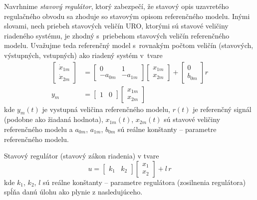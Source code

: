 \documentclass[a4paper, 10pt, ]{article}
\begin{document}
Navrhnime \emph{stavový regulátor}, ktorý zabezpečí, že stavový opis uzavretého regulačného obvodu sa zhoduje so stavovým opisom referenčného modelu. Inými slovami, nech priebeh stavových veličín URO, ktorými sú stavové veličiny riadeného systému, je zhodný s~priebehom stavových veličín referenčného modelu. Uvažujme teda referenčný model s~rovnakým počtom veličín (stavových, výstupných, vstupných) ako riadený systém v~tvare
\begin{subequations}
    \begin{align}
        \begin{bmatrix} \dot x_{1m} \\ \dot x_{2m} \end{bmatrix}
         &=
         \begin{bmatrix} 0 & 1 \\ -a_{0m} & -a_{1m} \end{bmatrix}
         \begin{bmatrix} x_{1m} \\ x_{2m} \end{bmatrix}
         +
         \begin{bmatrix} 0 \\ b_{0m} \end{bmatrix}
         r
         \label{stavovyOpisRM2R} \\
         y_m
         &=
         \begin{bmatrix} 1  & 0 \end{bmatrix}
         \begin{bmatrix} x_{1m} \\ x_{2m} \end{bmatrix}
    \end{align}
\end{subequations}
kde $y_m(t)$ je vystupná veličina referenčného modelu, $r(t)$ je referenčný signál (podobne ako žiadaná hodnota), $x_{1m}(t)$, $x_{2m}(t)$ sú stavové veličiny referenčného modelu a $a_{0m}$, $a_{1m}$, $b_{0m}$ sú reálne konštanty -- parametre referenčného modelu.








Stavový regulátor (stavový zákon riadenia) v tvare
\begin{equation} \label{stavZakRiad2r}
    u =
    \begin{bmatrix} k_1 & k_2 \end{bmatrix}
    \begin{bmatrix} x_1 \\ x_2 \end{bmatrix}
    + l \, r
\end{equation}
kde $k_1$, $k_2$, $l$ sú reálne konštanty -- parametre regulátora (zosilnenia regulátora) spĺňa danú úlohu ako plynie z nasledujúceho.
\end{document}
